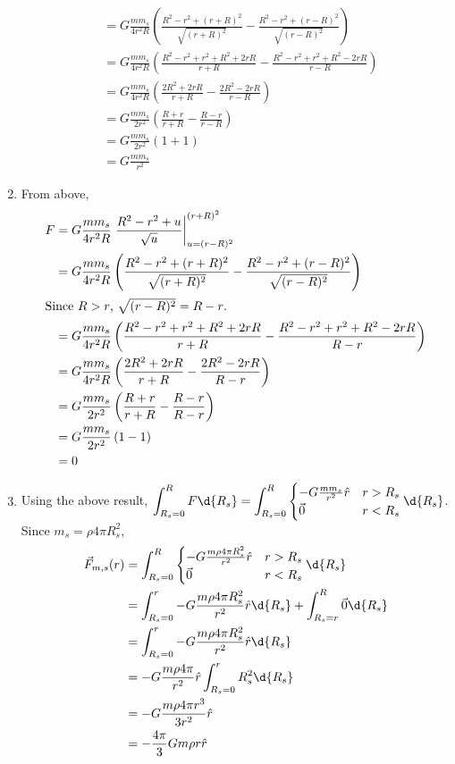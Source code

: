 \documentclass[solutions]{esg8012pset}
\begin{document}
\begin{enumerate}[1)]
\begin{align*}
     & = G \frac{m m_s}{4r^2R} \left(\frac{R^2 - r^2 + (r+R)^2}{\sqrt{(r+R)^2}} - \frac{R^2 - r^2 + (r-R)^2}{\sqrt{(r-R)^2}}\right) \\
     & = G \frac{m m_s}{4r^2R} \left(\frac{R^2 - r^2 + r^2 + R^2 + 2rR}{r+R} - \frac{R^2 - r^2 + r^2 + R^2 -2rR}{r-R}\right) \\
     & = G \frac{m m_s}{4r^2R} \left(\frac{2R^2 + 2rR}{r+R} - \frac{2R^2 - 2rR}{r-R}\right) \\
     & = G \frac{m m_s}{2r^2} \left(\frac{R + r}{r+R} - \frac{R - r}{r-R}\right) \\
     & = G \frac{m m_s}{2r^2} \left(1 + 1\right) \\
     & = G \frac{m m_s}{r^2}
    \end{align*}
    \item From above, \begin{align*}
     F & = G \frac{m m_s}{4r^2R} \left.\frac{R^2 - r^2 + u}{\sqrt{u}}\right|_{u = (r-R)^2}^{(r+R)^2} \\
     & = G \frac{m m_s}{4r^2R} \left(\frac{R^2 - r^2 + (r+R)^2}{\sqrt{(r+R)^2}} - \frac{R^2 - r^2 + (r-R)^2}{\sqrt{(r-R)^2}}\right) \\
     \intertext{Since $R>r$, $\sqrt{(r-R)^2} = R - r$.}
     & = G \frac{m m_s}{4r^2R} \left(\frac{R^2 - r^2 + r^2 + R^2 + 2rR}{r+R} - \frac{R^2 - r^2 + r^2 + R^2 -2rR}{R - r}\right) \\
     & = G \frac{m m_s}{4r^2R} \left(\frac{2R^2 + 2rR}{r+R} - \frac{2R^2 - 2rR}{R - r}\right) \\
     & = G \frac{m m_s}{2r^2} \left(\frac{R + r}{r+R} - \frac{R - r}{R - r}\right) \\
     & = G \frac{m m_s}{2r^2} \left(1 - 1\right) \\
     & = 0
    \end{align*}
    \item Using the above result, $\displaystyle \int_{R_s=0}^{R} F\d{R_s} = \int_{R_s=0}^{R} \begin{cases} -G\frac{mm_s}{r^2}\hat r & r > R_s \\ \vec 0 & r < R_s\end{cases} \d{R_s}$.  Since $m_s = \rho 4\pi R_s^2$, \begin{align*}
     \vec F_{m,s}(r) & =  \int_{R_s=0}^{R} \begin{cases} -G\frac{m \rho 4\pi R_s^2 }{r^2}\hat r & r > R_s \\ \vec 0 & r < R_s\end{cases} \d{R_s} \\
     & = \int_{R_s=0}^{r} -G\frac{m \rho 4\pi R_s^2 }{r^2}\hat r \d{R_s} + \int_{R_s=r}^{R} \vec 0 \d{R_s} \\
     & = \int_{R_s=0}^{r} -G\frac{m \rho 4\pi R_s^2 }{r^2}\hat r \d{R_s} \\
     & = -G\frac{m \rho 4\pi}{r^2}\hat r \int_{R_s=0}^{r} R_s^2 \d{R_s} \\
     & = -G\frac{m \rho 4\pi r^3}{3 r^2}\hat r \\
     & = -\frac{4\pi}{3}G m \rho r\hat r
    \end{align*}
  \end{enumerate}
\end{document}
